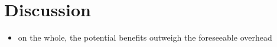 \section{Discussion}\label{sec:discussion} 

\begin{itemize}
\item on the whole, the potential benefits outweigh the foreseeable overhead
\end{itemize}

